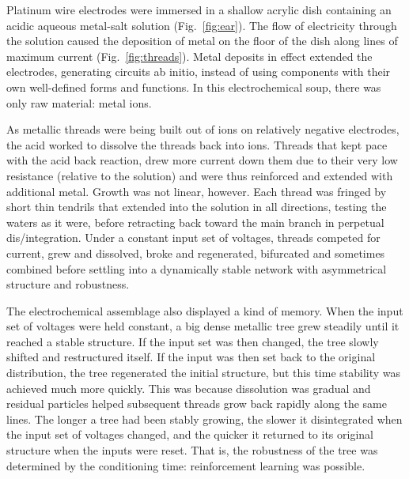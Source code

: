 

Platinum wire electrodes were immersed in a shallow acrylic dish containing an
acidic 
aqueous metal-salt
solution
\cite{pask1958physical}
(Fig.~\ref{fig:ear}).
The flow of electricity through the solution caused the deposition of metal
on the floor of the dish
along lines of maximum current
(Fig.~\ref{fig:threads}).
Metal deposits in effect extended the electrodes, generating circuits ab initio, 
instead of using components with their own well-defined forms and functions.
In this electrochemical soup,
there was only raw material: metal ions. 

As metallic 
threads were being built out of ions on relatively negative electrodes,
the acid worked to dissolve the threads back into ions.
Threads that kept pace with the acid back reaction, drew more current down them 
due to their very low resistance (relative to the solution) and were thus
reinforced and extended with additional metal.
Growth was not linear, however.
Each thread was fringed 
by short thin tendrils that extended into the solution in all directions, testing the waters as it were, before retracting back toward the main branch in perpetual dis/integration.
Under a constant input set of voltages,
threads
competed for current, grew and dissolved, broke and regenerated, bifurcated and sometimes combined before settling into
a dynamically stable network with asymmetrical structure and robustness.

The electrochemical assemblage also displayed a kind of memory.
When the input set of voltages were held constant, a big dense metallic tree grew steadily until it reached a stable structure.
If the input set was then changed, the tree slowly
shifted and
restructured itself.
If the input was then set back to the original distribution,
the tree regenerated the initial structure, but this time stability was achieved much more quickly.
This was because dissolution was gradual and 
residual particles helped subsequent threads grow back rapidly along the same lines.
The longer a tree had been stably growing, the slower it disintegrated when the input set of voltages changed, and the quicker it returned to its original structure when the inputs were reset.
That is, the robustness of the tree was determined by the conditioning time:
reinforcement learning was possible.

